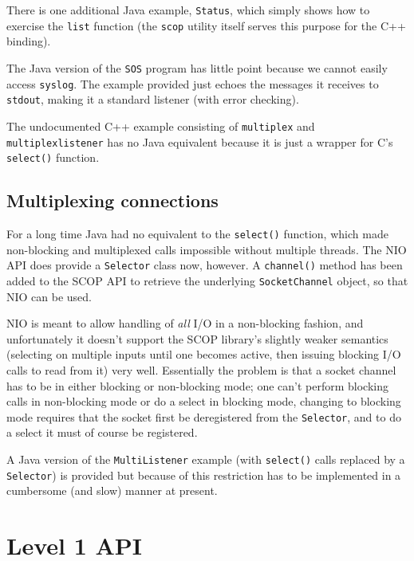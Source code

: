 \documentclass[12pt,a4paper,twoside]{article}
\renewcommand{\_}{\texttt{\symbol{95}}}
\begin{document}
There is one additional Java example, \texttt{Status}, which simply shows how
to exercise the \texttt{list} function (the \texttt{scop} utility itself
serves this purpose for the C++ binding).

The Java version of the \texttt{SOS} program has little point
because we cannot easily access \texttt{syslog}. The example
provided just echoes the messages it receives to \texttt{stdout},
making it a standard listener (with error checking).

The undocumented C++ example consisting of \texttt{multiplex} and
\texttt{multiplex\_listener} has no Java equivalent because it is
just a wrapper for C's \texttt{select()} function.

\subsection{Multiplexing connections}

For a long time Java had no equivalent to the \texttt{select()} function, which
made non-blocking and multiplexed calls impossible without multiple
threads. The NIO API does provide a \texttt{Selector} class now, however.
A \texttt{channel()} method has been added to the SCOP API to retrieve the
underlying \texttt{SocketChannel} object, so that NIO can be used.

NIO is meant to allow handling of \textit{all} I/O in a non-blocking
fashion, and unfortunately it doesn't support the SCOP
library's slightly weaker semantics (selecting on multiple inputs until one
becomes active, then issuing blocking I/O calls to read from it)
very well. Essentially the problem is that a socket channel has to be in either
blocking or non-blocking mode; one can't perform blocking calls in
non-blocking mode or do a select in blocking mode, changing to blocking
mode requires that the socket first be deregistered from the \texttt{Selector},
and to do a select it must of course be registered.

A Java version of the \texttt{MultiListener} example (with \texttt{select()}
calls replaced by a \texttt{Selector}) is provided but because of this
restriction has to be implemented in a cumbersome (and slow) manner at present.

\section{Level 1 API}
\end{document}
